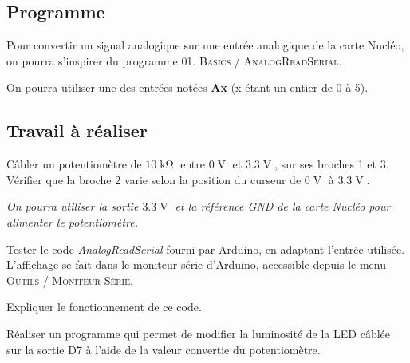 \documentclass[a4paper,11pt,titlepage]{article} %
\begin{document}
\subsection{Programme}

Pour convertir un signal analogique sur une entrée analogique de la carte Nucléo, on pourra s'inspirer du programme \textsc{01. Basics / AnalogReadSerial}.

On pourra utiliser une des entrées notées \textbf{Ax} (x étant un entier de 0 à 5).


\subsection{Travail à réaliser}

\Manip Câbler un potentiomètre de $10\operatorname{k\Omega}$ entre $0\operatorname{V}$ et $3.3\operatorname{V}$, sur ses broches 1 et 3. Vérifier que la broche 2 varie selon la position du curseur de $0\operatorname{V}$ à $3.3\operatorname{V}$.

\textit{On pourra utiliser la sortie $3.3\operatorname{V}$ et la référence \textit{GND} de la carte Nucléo pour alimenter le potentiomètre.}

\Manip Tester le code \textsl{AnalogReadSerial} fourni par Arduino, en adaptant l'entrée utilisée. L'affichage se fait dans le moniteur série d'Arduino, accessible depuis le menu \textsc{Outils / Moniteur Série}.

\Quest Expliquer le fonctionnement de ce code.

\Manip Réaliser un programme qui permet de modifier la luminosité de la LED câblée sur la sortie D7 à l'aide de la valeur convertie du potentiomètre.
\end{document}
